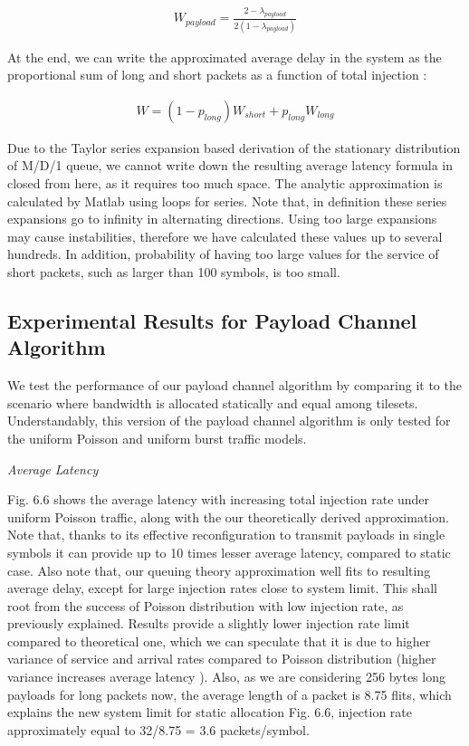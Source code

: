 \begin{align}
W_{payload} = \frac{2-\lambda_{payload}}{2(1-\lambda_{payload})}
\end{align}


At the end, we can write the approximated average delay in the system as the proportional sum of long and short packets as a function of total injection :

\begin{align}
W = (1- p_{long})W_{short} + p_{long}W_{long}
\end{align}

Due to the Taylor series expansion based derivation of the stationary distribution of M/D/1 queue, we cannot write down the resulting average latency formula in closed from here, as it requires too much space. The analytic approximation is calculated by Matlab using loops for series. Note that, in definition these series expansions go to infinity in alternating directions. Using too large expansions may cause instabilities, therefore we have calculated these values up to several hundreds. In addition, probability of having too large values for the service of short packets, such as larger than 100 symbols, is too small. 
 
\subsection{Experimental Results for Payload Channel Algorithm}

We test the performance of our payload channel algorithm by comparing it to the scenario where bandwidth is allocated statically and equal among tilesets. Understandably, this version of the payload channel algorithm is only tested for the uniform Poisson and uniform burst traffic models.

\textit{Average Latency}


Fig. 6.6 shows the average latency with increasing total injection rate under uniform Poisson traffic, along with the our theoretically derived approximation. Note that, thanks to its effective reconfiguration to transmit payloads in single symbols it can provide up to 10 times lesser average latency, compared to static case. Also note that, our queuing theory approximation well fits to resulting average delay, except for large injection rates close to system limit. This shall root from the success of Poisson distribution with low injection rate, as previously explained. Results provide a slightly lower injection rate limit compared to theoretical one, which we can speculate that it is due to higher variance of service and arrival rates compared to Poisson distribution (higher variance increases average latency \cite{khinchin1967mathematical}). Also, as we are considering 256 bytes long payloads for long packets now, the average length of a packet is 8.75 flits, which explains the new system limit for static allocation Fig. 6.6, injection rate approximately equal to 32/8.75 = 3.6 packets/symbol.  

